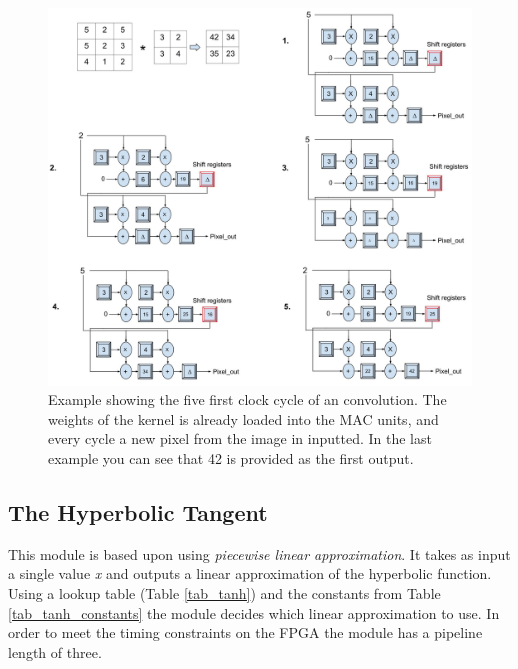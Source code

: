 \begin{figure}[h!]
  \centering
      \includegraphics[width=1.1\textwidth]{Figures/Method/Conv_example}
  \caption[Convolution example]{Example showing the five first clock cycle of an convolution. The weights of the kernel is already loaded into the MAC units, and every cycle a new pixel from the image in inputted. In the last example you can see that 42 is provided as the first output.}
\end{figure}


\subsection{The Hyperbolic Tangent} 

This module is based upon \cite{Lin2008} using \textit{piecewise linear approximation}. It takes  as input a single value \textit{x} and outputs a linear approximation of the hyperbolic function. Using a lookup table (Table \ref{tab_tanh}) and the constants from Table \ref{tab_tanh_constants} the module decides which linear approximation to use. 
In order to meet the timing constraints on the FPGA the module has a pipeline length of three. 

